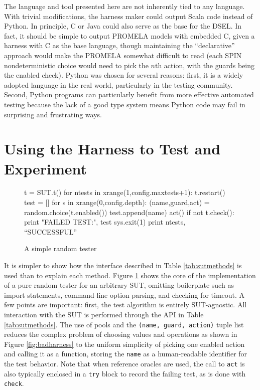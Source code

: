 \documentclass[runningheads,a4paper]{llncs}
\begin{document}
The language and tool presented here are not inherently tied to any
language.  With trivial modifications, the harness maker could output
Scala code instead of Python.  In principle, C or Java could also
serve as the base for the DSEL.  In fact, it should be simple to
output PROMELA models with embedded C, given a harness with C as the
base language, though maintaining the ``declarative'' approach would
make the PROMELA somewhat difficult to read (each SPIN
nondeterministic choice would need to pick the $n$th action, with the
guards being the enabled check).  Python was chosen for several
reasons: first, it is a widely adopted language in the real world,
particularly in the testing community.  Second, Python programs can
particularly benefit from more effective automated testing because the
lack of a good type system means Python code may
fail in surprising and frustrating ways.  

\section{Using the Harness to Test and Experiment}

\begin{figure}[t]
{\scriptsize
\begin{code}
t = SUT.t()
for ntests in xrange(1,config.maxtests+1):
    t.restart()
    test = []
    for s in xrange(0,config.depth):
        (name,guard,act) = random.choice(t.enabled())
        test.append(name)
        act()
	if not t.check():
            print "FAILED TEST:", test
            sys.exit(1)
print ntests, ``SUCCESSFUL''
\end{code}
}
\caption{A simple random tester}
\label{fig:randomtest}
\end{figure}

It is simpler to show how the interface described in Table
\ref{tab:sutmethods} is used than to explain each method.  Figure
\ref{fig:randomtest} shows the core of the implementation of a pure
random tester for an arbitrary SUT, omitting boilerplate such as
import statements, command-line option parsing, and checking for
timeout.  A few points are important: first, the test algorithm is
entirely SUT-agnostic.  All interaction with the SUT is performed through the API in Table \ref{tab:sutmethods}.  The use of pools and the {\tt (name, guard,
  action)} tuple list reduces the complex problem of choosing values and
operations as shown in Figure \ref{fig:badharness} to the uniform
simplicity of picking one enabled action and calling it as a function, storing the {\tt name} as a human-readable identifier for the test behavior.  Note that when reference oracles are used, the
call to {\tt act} is also typically enclosed in a {\tt try} block to
record the failing test, as is done with {\tt check}.
\end{document}
